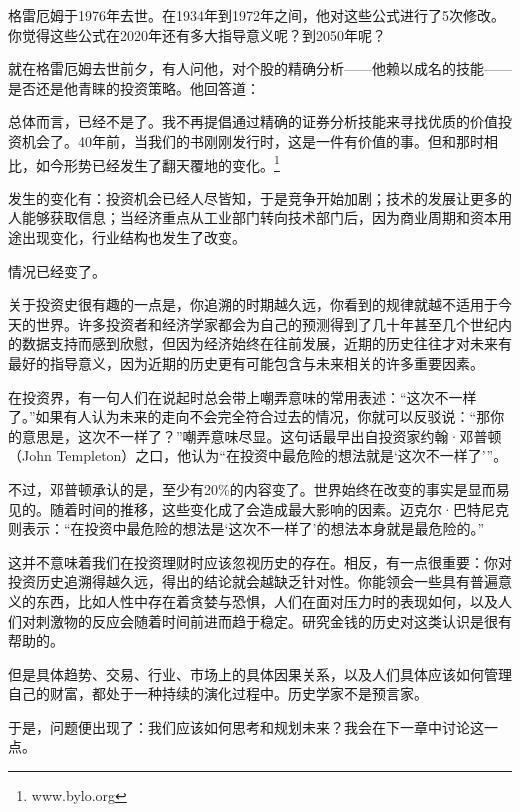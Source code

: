 格雷厄姆于1976年去世。在1934年到1972年之间，他对这些公式进行了5次修改。你觉得这些公式在2020年还有多大指导意义呢？到2050年呢？

就在格雷厄姆去世前夕，有人问他，对个股的精确分析——他赖以成名的技能——是否还是他青睐的投资策略。他回答道：

{\kaishu

总体而言，已经不是了。我不再提倡通过精确的证券分析技能来寻找优质的价值投资机会了。40年前，当我们的书刚刚发行时，这是一件有价值的事。但和那时相比，如今形势已经发生了翻天覆地的变化。\footnote{www.bylo.org}

}

发生的变化有：投资机会已经人尽皆知，于是竞争开始加剧；技术的发展让更多的人能够获取信息；当经济重点从工业部门转向技术部门后，因为商业周期和资本用途出现变化，行业结构也发生了改变。

情况已经变了。

关于投资史很有趣的一点是，你追溯的时期越久远，你看到的规律就越不适用于今天的世界。许多投资者和经济学家都会为自己的预测得到了几十年甚至几个世纪内的数据支持而感到欣慰，但因为经济始终在往前发展，近期的历史往往才对未来有最好的指导意义，因为近期的历史更有可能包含与未来相关的许多重要因素。

在投资界，有一句人们在说起时总会带上嘲弄意味的常用表述：“这次不一样了。”如果有人认为未来的走向不会完全符合过去的情况，你就可以反驳说：“那你的意思是，这次不一样了？”嘲弄意味尽显。这句话最早出自投资家约翰·邓普顿（John Templeton）之口，他认为“在投资中最危险的想法就是‘这次不一样了’”。

不过，邓普顿承认的是，至少有20\%的内容变了。世界始终在改变的事实是显而易见的。随着时间的推移，这些变化成了会造成最大影响的因素。迈克尔·巴特尼克则表示：“在投资中最危险的想法是‘这次不一样了’的想法本身就是最危险的。”

这并不意味着我们在投资理财时应该忽视历史的存在。相反，有一点很重要：你对投资历史追溯得越久远，得出的结论就会越缺乏针对性。你能领会一些具有普遍意义的东西，比如人性中存在着贪婪与恐惧，人们在面对压力时的表现如何，以及人们对刺激物的反应会随着时间前进而趋于稳定。研究金钱的历史对这类认识是很有帮助的。

但是具体趋势、交易、行业、市场上的具体因果关系，以及人们具体应该如何管理自己的财富，都处于一种持续的演化过程中。历史学家不是预言家。

于是，问题便出现了：我们应该如何思考和规划未来？我会在下一章中讨论这一点。
